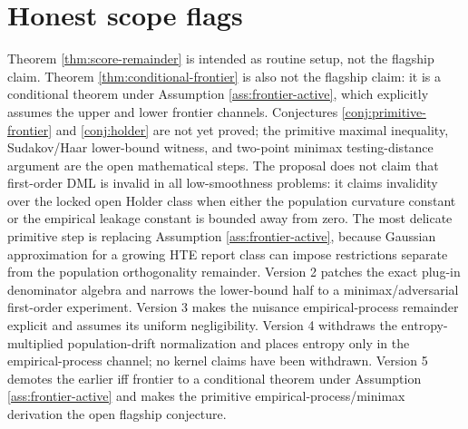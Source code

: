 \documentclass[11pt]{article}
\theoremstyle{definition}
\theoremstyle{plain}
\theoremstyle{remark}
\begin{document}
\section{Honest scope flags}
Theorem \ref{thm:score-remainder} is intended as routine setup, not the
flagship claim.  Theorem \ref{thm:conditional-frontier} is also not the
flagship claim: it is a conditional theorem under Assumption
\ref{ass:frontier-active}, which explicitly assumes the upper and lower
frontier channels.  Conjectures \ref{conj:primitive-frontier} and
\ref{conj:holder} are not yet proved; the primitive maximal inequality,
Sudakov/Haar lower-bound witness, and two-point minimax testing-distance
argument are the open mathematical steps.  The proposal does not claim that
first-order DML is invalid in all low-smoothness problems: it claims invalidity
over the locked open Holder class when either the population curvature constant
or the empirical leakage constant is bounded away from zero.  The most delicate
primitive step is replacing Assumption \ref{ass:frontier-active}, because
Gaussian approximation for a growing HTE report class can impose restrictions
separate from the population orthogonality remainder.  Version 2 patches the exact
plug-in denominator algebra and narrows the lower-bound half to a
minimax/adversarial first-order experiment.  Version 3 makes the nuisance
empirical-process remainder explicit and assumes its uniform negligibility.
Version 4 withdraws the entropy-multiplied population-drift normalization and
places entropy only in the empirical-process channel; no kernel claims have
been withdrawn.  Version 5 demotes the earlier iff frontier to a conditional
theorem under Assumption \ref{ass:frontier-active} and makes the primitive
empirical-process/minimax derivation the open flagship conjecture.
\end{document}
